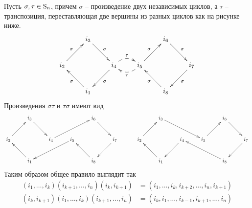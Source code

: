 Пусть $\sigma,\tau\in\operatorname{S}_{n}$, причем $\sigma$ -- произведение двух независимых циклов, а $\tau$ -- транспозиция, переставляющая две вершины из разных циклов как на рисунке ниже.
\[
\xymatrix{
{}&{i_3}\ar[dr]^{\sigma}&{}&{}&{i_6}\ar[dr]^{\sigma}&{}\\
{i_2}\ar[ur]^{\sigma}&{}&{i_4}\ar[dl]^{\sigma}\ar@{-->}@/^10pt/[r]^{\tau}&{i_5}\ar[ur]^{\sigma}\ar@{-->}@/^10pt/[l]^{\tau}&{}&{i_7}\ar[dl]^{\sigma}\\
{}&{i_1}\ar[ul]^{\sigma}&{}&{}&{i_8}\ar[ul]^{\sigma}&{}\\
}
\]
Произведения $\sigma\tau$ и $\tau\sigma$ имеют вид
\[
\xymatrix{
	{}&{i_3}\ar[dr]&{}&{}&{i_6}\ar[dr]&{}\\
	{i_2}\ar[ur]&{}&{i_4}\ar[urr]&{i_5}\ar[dll]&{}&{i_7}\ar[dl]\\
	{}&{i_1}\ar[ul]&{}&{}&{i_8}\ar[ul]&{}\\
}
\quad\quad\quad
\xymatrix{
	{}&{i_3}\ar[drr]&{}&{}&{i_6}\ar[dr]&{}\\
	{i_2}\ar[ur]&{}&{i_4}\ar[dl]&{i_5}\ar[ur]&{}&{i_7}\ar[dl]\\
	{}&{i_1}\ar[ul]&{}&{}&{i_8}\ar[ull]&{}\\
}
\]
Таким образом общее правило выглядит так
\begin{align*}
(i_1,\ldots,i_k)(i_{k+1},\ldots,i_n)(i_k,i_{k+1}) &=(i_1,\ldots,i_k,i_{k+2},\ldots,i_n,i_{k+1})\\
(i_k,i_{k+1})(i_1,\ldots,i_k)(i_{k+1},\ldots,i_n) &= (i_k,i_1,\ldots,i_{k-1},i_{k+1},\ldots,i_n)
\end{align*}
